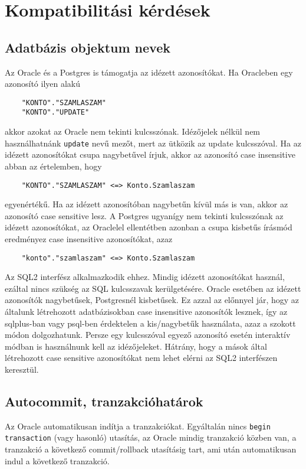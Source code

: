 
\section{Kompatibilitási kérdések}

\subsection{Adatbázis objektum nevek}

Az Oracle és a Postgres is támogatja az idézett azonosítókat.
Ha Oracleben egy azonosító ilyen alakú
\begin{verbatim}
    "KONTO"."SZAMLASZAM"
    "KONTO"."UPDATE"
\end{verbatim}
akkor azokat az Oracle nem tekinti kulcsszónak. Idézőjelek nélkül
nem használhatnánk \verb!update! nevű mezőt, mert az ütközik az
update kulcsszóval. Ha az idézett azonosítókat csupa nagybetűvel írjuk,
akkor az azonosító case insensitive abban az értelemben, hogy 
\begin{verbatim}
    "KONTO"."SZAMLASZAM" <=> Konto.Szamlaszam
\end{verbatim} 
egyenértékű. Ha az idézett azonosítóban nagybetűn kívül más is van,
akkor az azonosító case sensitive lesz.
A Postgres ugyanígy nem tekinti kulcsszónak
az idézett azonosítókat, az Oraclelel ellentétben azonban
a csupa kisbetűs írásmód eredményez case insensitive azonosítókat,
azaz 
\begin{verbatim}
    "konto"."szamlaszam" <=> Konto.Szamlaszam
\end{verbatim} 
Az SQL2 interfész alkalmazkodik ehhez. Mindig idézett azonosítókat
használ, ezáltal nincs szükség az SQL kulcsszavak kerülgetésére.
Oracle esetében az idézett azonosítók nagybetűsek, Postgresnél
kisbetűsek. Ez azzal az előnnyel jár, hogy az általunk létrehozott
adatbázisokban case insensitive azonosítók lesznek, így
az sqlplus-ban vagy psql-ben érdektelen a kis/nagybetűk használata,
azaz a szokott módon dolgozhatunk. Persze egy kulcsszóval egyező
azonosító esetén interaktív módban is használnunk kell az
idézőjeleket. Hátrány, hogy a mások által létrehozott case sensitive
azonosítókat nem lehet elérni az SQL2 interfészen keresztül.


\subsection{Autocommit, tranzakcióhatárok}

Az Oracle automatikusan indítja a tranzakciókat.
Egyáltalán nincs \verb!begin transaction! (vagy hasonló) utasítás,
az Oracle mindig tranzakció közben van,
a tranzakció a következő commit/rollback utasításig tart,
ami után automatikusan indul a következő tranzakció.

